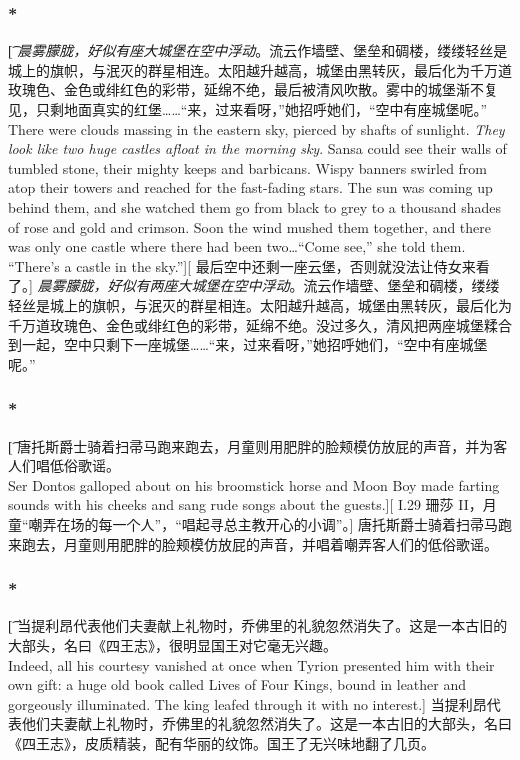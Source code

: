 \documentclass[12pt,a4paper]{article}
\begin{document}
\subsubsection{\color{red}*}\t[
	\emph{晨雾朦胧，好似有座大城堡在空中浮动}。流云作墙壁、堡垒和碉楼，缕缕轻丝是城上的旗帜，与泯灭的群星相连。太阳越升越高，城堡由黑转灰，最后化为千万道玫瑰色、金色或绯红色的彩带，延绵不绝，最后被清风吹散。雾中的城堡渐不复见，只剩地面真实的红堡……“来，过来看呀，”她招呼她们，“空中有座城堡呢。” \\
	There were clouds massing in the eastern sky, pierced by shafts of sunlight. \emph{They look like two huge castles afloat in the morning sky}. Sansa could see their walls of tumbled stone, their mighty keeps and barbicans. Wispy banners swirled from atop their towers and reached for the fast-fading stars. The sun was coming up behind them, and she watched them go from black to grey to a thousand shades of rose and gold and crimson. Soon the wind mushed them together, and there was only one castle where there had been two\ldots “Come see,” she told them. “There's a castle in the sky.”][
	最后空中还剩一座云堡，否则就没法让侍女来看了。]
	\emph{晨雾朦胧，好似有两座大城堡在空中浮动}。流云作墙壁、堡垒和碉楼，缕缕轻丝是城上的旗帜，与泯灭的群星相连。太阳越升越高，城堡由黑转灰，最后化为千万道玫瑰色、金色或绯红色的彩带，延绵不绝。没过多久，清风把两座城堡糅合到一起，空中只剩下一座城堡……“来，过来看呀，”她招呼她们，“空中有座城堡呢。” 
	
\subsubsection{\color{red}*}\t[
	唐托斯爵士骑着扫帚马跑来跑去，月童则用肥胖的脸颊模仿放屁的声音，并为客人们唱低俗歌谣。\\
	Ser Dontos galloped about on his broomstick horse and Moon Boy made farting sounds with his cheeks and sang rude songs about the guests.][
	I.29 珊莎 II，月童“嘲弄在场的每一个人”，“唱起寻总主教开心的小调”。]
	唐托斯爵士骑着扫帚马跑来跑去，月童则用肥胖的脸颊模仿放屁的声音，并唱着嘲弄客人们的低俗歌谣。
	
\subsubsection{\color{red}*}\t[
	当提利昂代表他们夫妻献上礼物时，乔佛里的礼貌忽然消失了。这是一本古旧的大部头，名曰《四王志》，很明显国王对它毫无兴趣。\\
	Indeed, all his courtesy vanished at once when Tyrion presented him with their own gift: a huge old book called Lives of Four Kings, bound in leather and gorgeously illuminated. The king leafed through it with no interest.]
	当提利昂代表他们夫妻献上礼物时，乔佛里的礼貌忽然消失了。这是一本古旧的大部头，名曰《四王志》，皮质精装，配有华丽的纹饰。国王了无兴味地翻了几页。	
		
\end{document}
